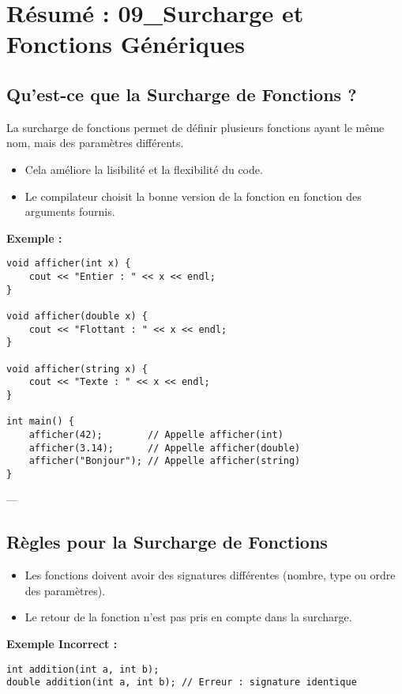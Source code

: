 \section{ Résumé : 09\_Surcharge et Fonctions Génériques}

\subsection{ Qu'est-ce que la Surcharge de Fonctions ?}
La surcharge de fonctions permet de définir plusieurs fonctions ayant le même nom, mais des paramètres différents.
\begin{itemize}
    \item Cela améliore la lisibilité et la flexibilité du code.
    \item Le compilateur choisit la bonne version de la fonction en fonction des arguments fournis.
\end{itemize}

\textbf{Exemple :}
\begin{tcolorbox}[colframe=blue!50!black, colback=blue!5!white, title=Exemple de Surcharge de Fonctions]
\begin{verbatim}
void afficher(int x) {
    cout << "Entier : " << x << endl;
}

void afficher(double x) {
    cout << "Flottant : " << x << endl;
}

void afficher(string x) {
    cout << "Texte : " << x << endl;
}

int main() {
    afficher(42);        // Appelle afficher(int)
    afficher(3.14);      // Appelle afficher(double)
    afficher("Bonjour"); // Appelle afficher(string)
}
\end{verbatim}
\end{tcolorbox}

---

\subsection{ Règles pour la Surcharge de Fonctions}
\begin{itemize}
    \item Les fonctions doivent avoir des signatures différentes (nombre, type ou ordre des paramètres).
    \item Le retour de la fonction n'est pas pris en compte dans la surcharge.
\end{itemize}

\textbf{Exemple Incorrect :}
\begin{tcolorbox}[colframe=blue!50!black, colback=blue!5!white, title=Exemple Incorrect de Surcharge]
\begin{verbatim}
int addition(int a, int b);
double addition(int a, int b); // Erreur : signature identique
\end{verbatim}
\end{tcolorbox}

